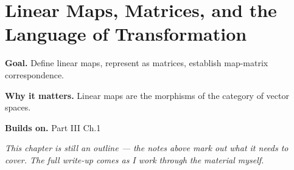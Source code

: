 \chapter{Linear Maps, Matrices, and the Language of Transformation}
\label{ch:03-linear-algebra-02}

\begin{chapterintro}
\textbf{Goal.} Define linear maps, represent as matrices, establish map-matrix correspondence.

\textbf{Why it matters.} Linear maps are the morphisms of the category of vector spaces.

\textbf{Builds on.} Part III Ch.1
\end{chapterintro}

\textit{This chapter is still an outline --- the notes above mark out what it needs to cover. The full write-up comes as I work through the material myself.}
